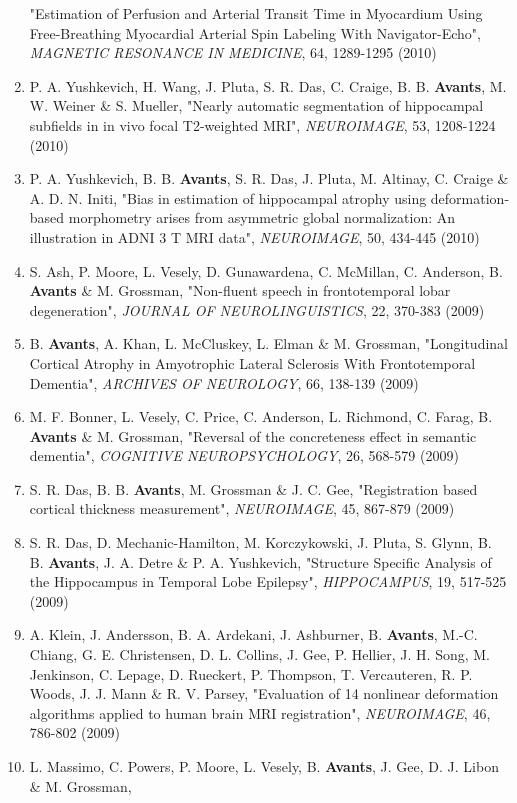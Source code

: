 \documentclass[11pt]{moderncv} %
\begin{document}
\begin{enumerate}
"Estimation of Perfusion and Arterial Transit Time in Myocardium Using Free-Breathing Myocardial Arterial Spin Labeling With Navigator-Echo", 
{\em MAGNETIC RESONANCE IN MEDICINE}, 64, 1289-1295 (2010)
\item P. A. Yushkevich, H. Wang, J. Pluta, S. R. Das, C. Craige, B. B. \textbf{Avants}, M. W. Weiner \&  S. Mueller, 
"Nearly automatic segmentation of hippocampal subfields in in vivo focal T2-weighted MRI", 
{\em NEUROIMAGE}, 53, 1208-1224 (2010)
\item P. A. Yushkevich, B. B. \textbf{Avants}, S. R. Das, J. Pluta, M. Altinay, C. Craige \&  A. D. N. Initi, 
"Bias in estimation of hippocampal atrophy using deformation-based morphometry arises from asymmetric global normalization: An illustration in ADNI 3 T MRI data", 
{\em NEUROIMAGE}, 50, 434-445 (2010)
\item S. Ash, P. Moore, L. Vesely, D. Gunawardena, C. McMillan, C. Anderson, B. \textbf{Avants} \&  M. Grossman, 
"Non-fluent speech in frontotemporal lobar degeneration", 
{\em JOURNAL OF NEUROLINGUISTICS}, 22, 370-383 (2009)
\item B. \textbf{Avants}, A. Khan, L. McCluskey, L. Elman \&  M. Grossman, 
"Longitudinal Cortical Atrophy in Amyotrophic Lateral Sclerosis With Frontotemporal Dementia", 
{\em ARCHIVES OF NEUROLOGY}, 66, 138-139 (2009)
\item M. F. Bonner, L. Vesely, C. Price, C. Anderson, L. Richmond, C. Farag, B. \textbf{Avants} \&  M. Grossman, 
"Reversal of the concreteness effect in semantic dementia", 
{\em COGNITIVE NEUROPSYCHOLOGY}, 26, 568-579 (2009)
\item S. R. Das, B. B. \textbf{Avants}, M. Grossman \&  J. C. Gee, 
"Registration based cortical thickness measurement", 
{\em NEUROIMAGE}, 45, 867-879 (2009)
\item S. R. Das, D. Mechanic-Hamilton, M. Korczykowski, J. Pluta, S. Glynn, B. B. \textbf{Avants}, J. A. Detre \&  P. A. Yushkevich, 
"Structure Specific Analysis of the Hippocampus in Temporal Lobe Epilepsy", 
{\em HIPPOCAMPUS}, 19, 517-525 (2009)
\item A. Klein, J. Andersson, B. A. Ardekani, J. Ashburner, B. \textbf{Avants}, M.-C. Chiang, G. E. Christensen, D. L. Collins, J. Gee, P. Hellier, J. H. Song, M. Jenkinson, C. Lepage, D. Rueckert, P. Thompson, T. Vercauteren, R. P. Woods, J. J. Mann \&  R. V. Parsey, 
"Evaluation of 14 nonlinear deformation algorithms applied to human brain MRI registration", 
{\em NEUROIMAGE}, 46, 786-802 (2009)
\item L. Massimo, C. Powers, P. Moore, L. Vesely, B. \textbf{Avants}, J. Gee, D. J. Libon \&  M. Grossman, 

\end{enumerate}
\end{document}

